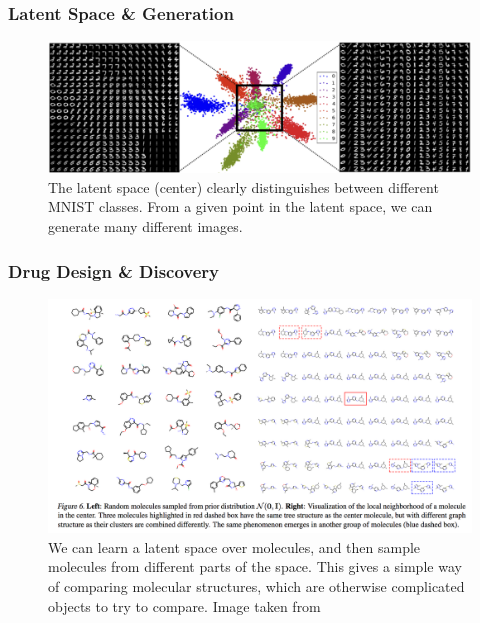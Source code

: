 \documentclass[10pt,mathserif]{beamer}
\begin{document}
\begin{frame}
  \frametitle{Latent Space \& Generation}
\begin{figure}[ht]
  \centering
  \includegraphics[width=0.8\paperwidth]{figure/vae_latent}
  \caption{The latent space (center) clearly distinguishes between different
    MNIST classes. From a given point in the latent space, we can generate many
    different images. \label{fig:vae_latent} }
\end{figure}
\end{frame}

\begin{frame}
  \frametitle{Drug Design \& Discovery}
\begin{figure}[ht]
  \centering
  \includegraphics[width=0.6\paperwidth]{figure/vae_molecule}
  \caption{We can learn a latent space over molecules, and then sample molecules
    from different parts of the space. This gives a simple way of comparing
    molecular structures, which are otherwise complicated objects to try to
    compare. Image taken from \citep{jin2018junction}}
\end{figure}
\end{frame}
\end{document}
